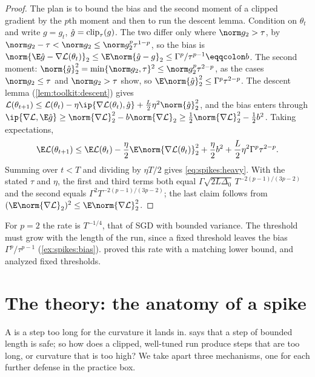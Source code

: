 \begin{refsection}
\begin{proof}
The plan is to bound the bias and the second moment of a clipped gradient by the $p$th moment and then to run the descent lemma. Condition on $\theta_t$ and write $g=g_t$, $\hat g=\operatorname{clip}_\tau(g)$. The two differ only where $\norm g_2>\tau$, by $\norm g_2-\tau<\norm g_2\le\norm g_2^p\tau^{1-p}$, so the bias is $\norm{\E\hat g-\nabla\Loss(\theta_t)}_2\le\E\norm{\hat g-g}_2\le\Gamma^p/\tau^{p-1}\eqqcolon b$. The second moment: $\norm{\hat g}_2^2=\min\{\norm g_2,\tau\}^2\le\norm g_2^p\tau^{2-p}$, as the cases $\norm g_2\le\tau$ and $\norm g_2>\tau$ show, so $\E\norm{\hat g}_2^2\le\Gamma^p\tau^{2-p}$. The descent lemma (\cref{lem:toolkit:descent}) gives $\Loss(\theta_{t+1})\le\Loss(\theta_t)-\eta\ip{\nabla\Loss(\theta_t),\hat g}+\frac L2\eta^2\norm{\hat g}_2^2$, and the bias enters through $\ip{\nabla\Loss,\E\hat g}\ge\norm{\nabla\Loss}_2^2-b\norm{\nabla\Loss}_2\ge\frac12\norm{\nabla\Loss}_2^2-\frac12b^2$. Taking expectations,
\[
  \E\Loss(\theta_{t+1})\le\E\Loss(\theta_t)-\frac\eta2\E\norm{\nabla\Loss(\theta_t)}_2^2+\frac\eta2b^2+\frac L2\eta^2\Gamma^p\tau^{2-p}.
\]
Summing over $t<T$ and dividing by $\eta T/2$ gives \eqref{eq:spikes:heavy}. With the stated $\tau$ and $\eta$, the first and third terms both equal $\Gamma\sqrt{2L\Delta_0}\,T^{-2(p-1)/(3p-2)}$ and the second equals $\Gamma^2T^{-2(p-1)/(3p-2)}$; the last claim follows from $(\E\norm{\nabla\Loss}_2)^2\le\E\norm{\nabla\Loss}_2^2$.
\end{proof}

For $p=2$ the rate is $T^{-1/4}$, that of SGD with bounded variance. The threshold must grow with the length of the run, since a fixed threshold leaves the bias $\Gamma^p/\tau^{p-1}$ (\cref{ex:spikes:bias}). \Textcite{ZhangEtAl2020Attention} proved this rate with a matching lower bound, and \textcite{KoloskovaHendrikxStich2023} analyzed fixed thresholds.

\section{The theory: the anatomy of a spike}\label{sec:spikes:anatomy}

A  is a step too long for the curvature it lands in.  says that a step of bounded length is safe; so how does a clipped, well-tuned run produce steps that are too long, or curvature that is too high? We take apart three mechanisms, one for each further defense in the practice box.


\end{refsection}

